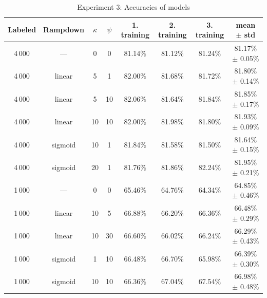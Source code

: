 \begin{table}[]
\begin{tabular}{|c|c|c|c|c|c|c|c|}
\hline
Labeled & Rampdown & $\kappa$ & $\psi$   & 1. training & 2. training & 3. training & mean $\pm$ std \\ \hline
4\,000          & ---      & 0     & 0   &    81.14\%       &      81.12\%        &     81.24\%        & 81.17\% $\pm$ 0.05\%                \\ \hline
4\,000          & linear      & 5     & 1   &    82.00\%       &    81.68\%         &    81.72\%         &   81.80\% $\pm$ 0.14\%                 \\ \hline
4\,000          & linear      & 5     & 10   &   82.06\%        &     81.64\%        &    81.84\%         &   81.85\% $\pm$ 0.17\%                 \\ \hline
4\,000          & linear      & 10     & 10   &  82.00\%         &    81.98\%          &  81.80\%           &       81.93\% $\pm$ 0.09\%             \\ \hline
4\,000          & sigmoid      & 10     & 1   &  81.84\%         &    81.58\%          &      81.50\%       &   81.64\% $\pm$ 0.15\%                 \\ \hline
4\,000          & sigmoid      & 20     & 1   &  81.76\%         &     81.86\%        &    82.24\%         &    81.95\% $\pm$ 0.21\%                \\ \hline

1\,000          & ---      & 0     & 0   &    65.46\%       &    64.76\%         &     64.34\%         & 64.85\% $\pm$ 0.46\%                \\ \hline
1\,000          & linear   & 10    & 5   &    66.88\%        &       66.20\%       &   66.36\%            & 66.48\% $\pm$ 0.29\%           \\ \hline
1\,000          & linear   & 10    & 30  &    66.60\%         &       66.02\%        &       66.24\%        &       66.29\%  $\pm$ 0.43\%    \\ \hline
1\,000          & sigmoid  & 1     & 10  &    66.48\%         &      66.70\%       &      65.98\%        &   66.39\% $\pm$ 0.30\%         \\ \hline
1\,000          & sigmoid  & 10    & 10  &    66.36\%         &     67.04\%        &      67.54\%       &      66.98\% $\pm$ 0.48\%      \\ \hline

\end{tabular}
\caption{Experiment 3: Accuracies of models}
\label{mean-results}
\end{table}


